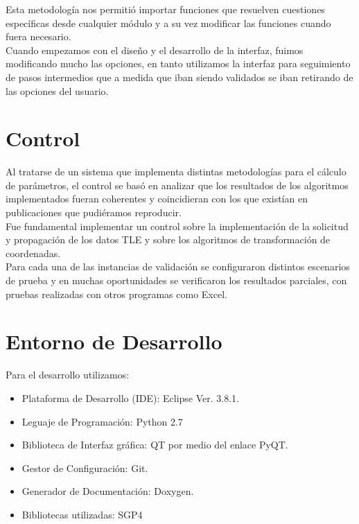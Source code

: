 Esta metodolog\'ia nos permiti\'o importar funciones que resuelven cuestiones espec\'ificas desde cualquier  m\'odulo y a su vez modificar las funciones cuando fuera necesario.\\
Cuando empezamos con el diseño y el desarrollo de la interfaz, fuimos modificando mucho las opciones, en tanto utilizamos la interfaz para seguimiento de pasos intermedios que a medida que iban siendo validados se iban retirando de las opciones del usuario.\\

\section{Control}
Al tratarse de un sistema que implementa distintas metodolog\'ias para el c\'alculo de par\'ametros, el control se bas\'o en analizar que los resultados de los algoritmos implementados fueran coherentes y coincidieran con los que exist\'ian en publicaciones que pudi\'eramos reproducir.\\
Fue fundamental implementar un control sobre la implementaci\'on de la solicitud y propagaci\'on de los datos TLE y sobre los algoritmos de transformaci\'on de coordenadas.\\
Para cada una de las instancias de validaci\'on se configuraron distintos escenarios de prueba y en muchas oportunidades se verificaron los resultados parciales, con pruebas realizadas con otros programas como Excel.\\

\section{Entorno de Desarrollo}

Para el desarrollo utilizamos:\\
\begin{itemize}
 \item Plataforma de Desarrollo (\ac{IDE}): Eclipse Ver. 3.8.1.
 \item Leguaje de Programaci\'on: Python 2.7
 \item Biblioteca de Interfaz gr\'afica: QT por medio del enlace PyQT.
 \item Gestor de Configuraci\'on: Git.
 \item Generador de Documentaci\'on: Doxygen.
 \item Bibliotecas utilizadas: SGP4 \citep{sgp4python}
\end{itemize}

